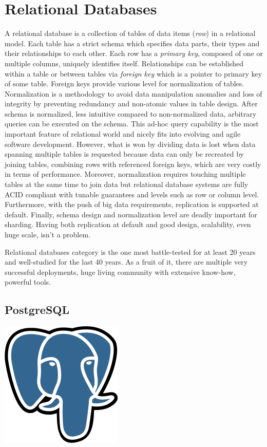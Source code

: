 \section{Relational Databases} 

A relational database is a collection of tables of data items (\textit{row}) in a relational model. Each table has a strict schema which specifies data parts, their types and their relationships to each other. Each row has a \textit{primary key}, composed of one or multiple columns, uniquely identifies itself. Relationships can be established within a table or between tables via \textit{foreign key} which is a pointer to primary key of some table. Foreign keys provide various level for normalization of tables. Normalization is a methodology to avoid data manipulation anomalies and loss of integrity by preventing redundancy and non-atomic values in table design. After schema is normalized, less intuitive compared to non-normalized data, arbitrary queries can be executed on the schema. This ad-hoc query capability is the most important feature of relational world and nicely fits into evolving and agile software development. However, what is won by dividing data is lost when data spanning multiple tables is requested because data can only be recreated by joining tables, combining rows with referenced foreign keys, which are very costly in terms of performance. Moreover, normalization requires touching multiple tables at the same time to join data but relational database systems are fully ACID compliant with tunable guarantees and levels such as row or column level. Furthermore, with the push of big data requirements, replication is supported at default. Finally, schema design and normalization level are deadly important for sharding. Having both replication at default and good design, scalability, even huge scale, isn't a problem.

Relational databases category is the one most battle-tested for at least 20 years and well-studied for the last 40 years. As a fruit of it, there are multiple very successful deployments, huge living community with extensive know-how, powerful tools.

\subsection{PostgreSQL}

\vspace{-1.15cm} \hspace{4.1cm} \includegraphics[scale=0.2]{3/figures/postgresql.png}


